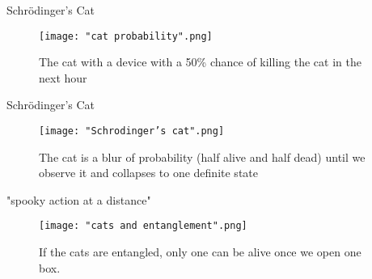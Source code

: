 \documentclass[handout, 10 pt]{beamer}
\begin{document}
\begin{frame}{Schrödinger's Cat}
\begin{figure}[h]
    \centering
    \texttt{[image: "cat probability".png]}
    \caption{The cat with a device with a 50\% chance of killing the cat in the next hour}
\end{figure}    
\end{frame}

\begin{frame}{Schrödinger's Cat}
\begin{figure}[h]
    \centering
    \texttt{[image: "Schrodinger's cat".png]}
    \caption{The cat is a blur of probability (half alive and half dead) until we observe it and collapses to one definite state}
    \label{fig:Schrödinger's cat}
\end{figure}    
\end{frame}

\begin{comment}
Another shocking thing about quantum mechanics is such phenomenon described by Albert Einstein as the "spooky action at a distance". What's so spooky about it is that one event in the universe can instantaneously affect another event arbitrarily far away, which seems to imply faster than light communication. We now refer to as entanglement and will go over it in more detail later. 
\end{comment}
\begin{frame}{"spooky action at a distance"}
\begin{figure}[h]
    \centering
    \texttt{[image: "cats and entanglement".png]}
    \caption{If the cats are entangled, only one can be alive once we open one box.}
\end{figure}
\end{frame}

\begin{comment}
In cryptography, Alice and Bob try to communicate securely under the prying eyes of Eve. In my thesis, I investigate to apply quantum mechanics phenomenon such as entanglement to enhance security in cryptography.
emphasize it's a collaborative game between Alice and Bob against Eve
\end{comment}
\end{document}
